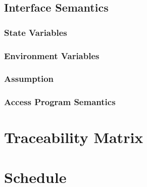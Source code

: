 \documentclass[11pt]{article}
\begin{document}
    \subsection{Interface Semantics}
    \subsubsection{State Variables}
    \subsubsection{Environment Variables}
    \subsubsection{Assumption}
    \subsubsection{Access Program Semantics}
    \section{Traceability Matrix}
    \section{Schedule}
    
    
\end{document}
